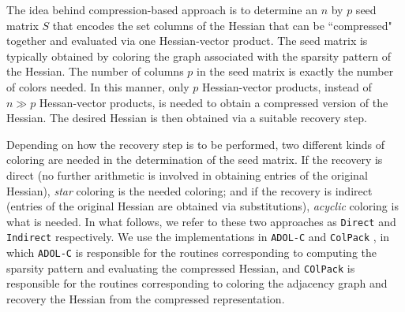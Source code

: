 \documentclass[11pt, twocolumn]{article}
\begin{document}
The idea behind compression-based approach is to determine an $n$ by $p$ seed matrix $S$
that encodes the set columns of the Hessian that can be ``compressed" together and evaluated via one Hessian-vector product. The seed matrix is typically obtained by
coloring the graph associated with the sparsity pattern of the Hessian. 
The number of columns $p$ in the seed matrix is exactly the number of colors needed. 
In this manner, only $p$ Hessian-vector products, instead of $n \gg p$ Hessan-vector products, is needed to obtain a compressed version of the Hessian. The desired Hessian is then obtained via a suitable recovery step.  

Depending on how the recovery step is to be performed, two different kinds of coloring are needed in the determination of the seed matrix. If the recovery is direct (no further arithmetic is involved in obtaining entries of the original Hessian),  {\em star} coloring is the needed coloring;
and if the recovery is indirect (entries of the original Hessian are obtained via substitutions), {\em acyclic} coloring is what is needed. In what follows, we refer to these two approaches  as {\tt Direct} and {\tt Indirect} respectively. We use the implementations in {\tt ADOL-C} \cite{walther2009getting} and {\tt ColPack} \cite{gebremedhin2013colpack}, in which {\tt ADOL-C} is responsible for the routines corresponding to computing the sparsity pattern and evaluating the compressed Hessian, and {\tt COlPack} is responsible for the routines  corresponding to coloring the adjacency graph and recovery the Hessian from the compressed representation.
\end{document}
